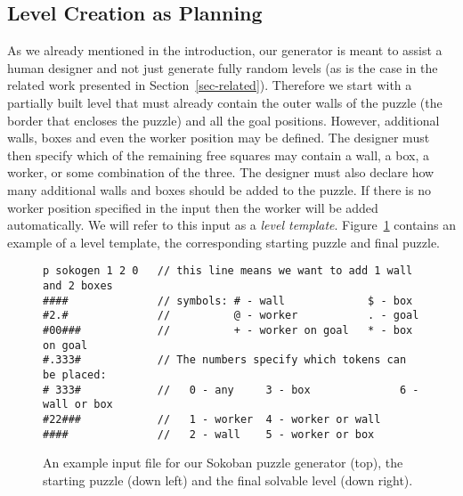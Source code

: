 \documentclass[runningheads]{llncs}
\begin{document}
\subsection{Level Creation as Planning}
As we already mentioned in the introduction, our generator is meant to assist a human designer and not
just generate fully random levels (as is the case in the related work presented in Section~\ref{sec-related}).
Therefore we start with a partially built level that must already contain the outer walls of the puzzle (the
border that encloses the puzzle) and all the goal positions. However, additional walls, boxes and even the 
worker position may be defined. The designer must then specify which of the remaining free squares may contain
a wall, a box, a worker, or some combination of the three. The designer must also declare how many additional
walls and boxes should be added to the puzzle. If there is no worker position specified in the input then
the worker will be added automatically. We will refer to this input as a \emph{level template}.
Figure~\ref{fig-input} contains an example of a level template, the
corresponding starting puzzle and final puzzle.

\begin{figure}
\begin{verbatim}
p sokogen 1 2 0   // this line means we want to add 1 wall and 2 boxes
####              // symbols: # - wall             $ - box
#2.#              //          @ - worker           . - goal
#00###            //          + - worker on goal   * - box on goal
#.333#            // The numbers specify which tokens can be placed:
# 333#            //   0 - any     3 - box              6 - wall or box
#22###            //   1 - worker  4 - worker or wall
####              //   2 - wall    5 - worker or box
\end{verbatim}
\centering
\w\w\w\w\e\e\e\e\w\w\w\w\e\e\n
\w\e\g\w\e\e\e\e\w\w\g\w\e\e\n
\w\e\e\w\w\w\e\e\w\e\p\w\w\w\n
\w\g\e\e\e\w\e\e\w\g\x\x\e\w\n
\w\e\e\e\e\w\e\e\w\e\e\e\e\w\n
\w\e\e\w\w\w\e\e\w\e\e\w\w\w\n
\w\w\w\w\e\e\e\e\w\w\w\w\e\e\n

\caption{An example input file for our Sokoban puzzle generator (top), the starting puzzle (down left)
and the final solvable level (down right).}
\label{fig-input}
\end{figure}
\end{document}
